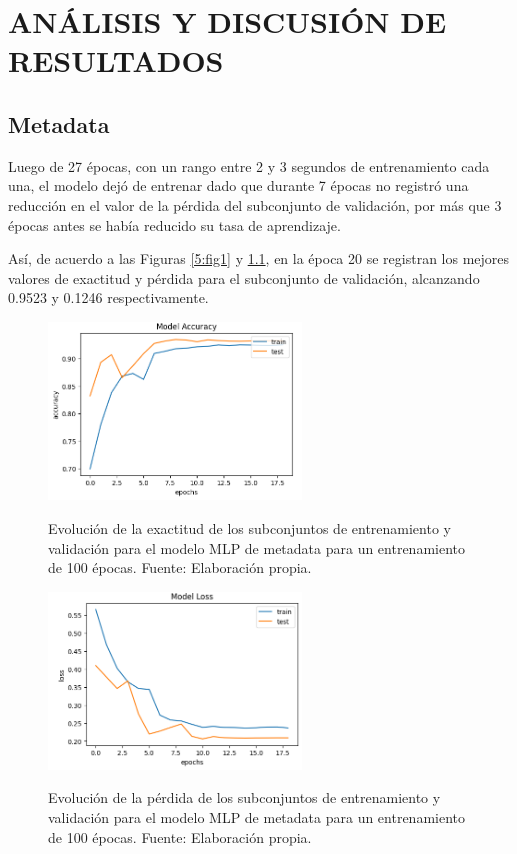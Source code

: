 \chapter{ANÁLISIS Y DISCUSIÓN DE RESULTADOS}
\section{Metadata}
Luego de 27 épocas, con un rango entre 2 y 3 segundos de entrenamiento cada una, el modelo dejó de entrenar dado que durante 7 épocas no registró una reducción en el valor de la pérdida del subconjunto de validación, por más que 3 épocas antes se había reducido su tasa de aprendizaje.

Así, de acuerdo a las Figuras \ref{5:fig1} y \ref{5:fig2}, en la época 20 se registran los mejores valores de exactitud y pérdida para el subconjunto de validación, alcanzando 0.9523 y 0.1246 respectivamente.

\begin{figure}[htbp]
	\begin{center}
		\includegraphics[width=0.60\textwidth]{4/figures/metadata_model_accuracy.png}
		\caption{Evolución de la exactitud de los subconjuntos de entrenamiento y validación para el modelo MLP de metadata para un entrenamiento de 100 épocas. Fuente: Elaboración propia.}
		\label{5:fig1}
		\includegraphics[width=0.60\textwidth]{4/figures/metadata_model_loss.png}
		\caption{Evolución de la pérdida de los subconjuntos de entrenamiento y validación para el modelo MLP de metadata para un entrenamiento de 100 épocas. Fuente: Elaboración propia.}
		\label{5:fig2}
	\end{center}
\end{figure}

